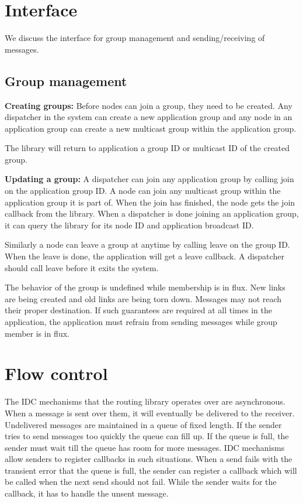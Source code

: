 \documentclass[a4paper,twoside]{report} %
\begin{document}
\section{Interface}
We discuss the interface for group management and sending/receiving of messages.

\subsection{Group management}

\textbf{Creating groups:}
Before nodes can join a group, they need to be created.
Any dispatcher in the system can create a new application group
and any node in an application group can create a new multicast group
within the application group.

The library will return to application a group ID or
multicast ID of the created group.

\textbf{Updating a group:}
A dispatcher can join any application group by calling join on
the application group ID.
A node can join any multicast group within the application group it is part of.
When the join has finished, the node gets the join callback from the library.
When a dispatcher is done joining an application group,
it can query the library for its node ID and application broadcast ID.

Similarly a node can leave a group at anytime by calling leave on the group ID.
When the leave is done, the application will get a leave callback.
A dispatcher should call leave before it exits the system.

The behavior of the group is undefined while membership is in flux.
New links are being created and old links are being torn down.
Messages may not reach their proper destination.
If such guarantees are required at all times in the application,
the application must refrain from sending messages while
group member is in flux.

\section{Flow control}
The IDC mechanisms that the routing library operates over are asynchronous.
When a message is sent over them,
it will eventually be delivered to the receiver.
Undelivered messages are maintained in a queue of fixed length.
If the sender tries to send messages too quickly the queue can fill up.
If the queue is full, the sender must wait
till the queue has room for more messages.
IDC mechanisms allow senders to register callbacks in such situations.
When a send fails with the transient error that
the queue is full, the sender can register
a callback which will be called when the next send should not fail.
While the sender waits for the callback, it has to handle the unsent message.
\end{document}
